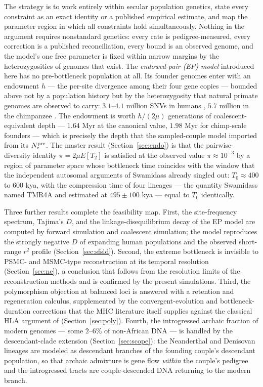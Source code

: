 The strategy is to work entirely within secular
population genetics, state every constraint as an exact identity or a
published empirical estimate, and map the parameter region in which all
constraints hold simultaneously. Nothing in the argument requires
nonstandard genetics: every rate is pedigree-measured, every correction is
a published reconciliation, every bound is an observed genome, and the
model's one free parameter is fixed within narrow margins by the
heterozygosities of genomes that exist. The
\emph{endowed-pair (EP) model} introduced here has no pre-bottleneck
population at all. Its founder genomes enter with an endowment $h$ --- the
per-site divergence among their four gene copies --- bounded above not by a
population history but by the heterozygosity that natural primate genomes
are observed to carry: $3.1$--$4.1$ million SNVs in humans
\citep{PradoMartinez2013,Auton2015}, $5.7$ million in the chimpanzee
\citep{PradoMartinez2013}. The endowment is worth $h/(2\mu)$ generations of
coalescent-equivalent depth --- $1.64$ Myr at the canonical value, $1.98$ Myr
for chimp-scale founders --- which is precisely the depth that the
sampled-couple model imported from its $N_{\mathrm{e}}^{\mathrm{pre}}$. The master result (Section~\ref{sec:endo})
is that the pairwise-diversity identity $\pi = 2\mu E[T_2]$ is satisfied at
the observed value $\pi \approx 10^{-3}$ by a region of parameter space
whose bottleneck time coincides with the window that the independent
autosomal arguments of Swamidass already singled out: $T_0 \approx 400$
to $600$ kya, with the compression time of four lineages --- the quantity
Swamidass named TMR4A and estimated at $495 \pm 100$ kya
\citep{Swamidass2019,Swamidass2022} --- equal to $T_0$ identically.

Three further results complete the feasibility map. First, the
site-frequency spectrum, Tajima's $D$, and the linkage-disequilibrium decay
of the EP model are computed by forward simulation and coalescent
simulation; the model reproduces the strongly negative $D$ of expanding
human populations and the observed short-range $r^2$ profile
(Section~\ref{sec:sfsld}). Second, the extreme bottleneck is invisible to
PSMC- and MSMC-type reconstruction at its temporal resolution
(Section~\ref{sec:ne}), a conclusion that follows from the resolution limits
of the reconstruction methods \citep{LiDurbin2011} and is confirmed by the
present simulations. Third, the
polymorphism objection at balanced loci is answered with a retention and
regeneration calculus, supplemented by the
convergent-evolution and bottleneck-duration corrections that the MHC
literature itself supplies against the classical HLA argument of
\citet{Ayala1995}
(Section~\ref{sec:poly}). Fourth, the introgressed archaic fraction of
modern genomes --- some $2$--$6\%$ of non-African DNA --- is handled by the
descendant-clade extension (Section~\ref{sec:scope}): the Neanderthal and
Denisovan lineages are modeled as descendant branches of the founding
couple's descendant population, so that archaic admixture is gene flow
\emph{within} the couple's pedigree and the introgressed tracts are
couple-descended DNA returning to the modern branch.

